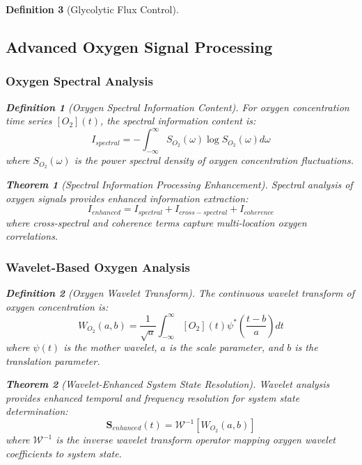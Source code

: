 \documentclass[12pt,a4paper]{article}
\newtheorem{theorem}{Theorem}
\newtheorem{definition}{Definition}
\begin{document}
\begin{definition}[Glycolytic Flux Control]
\subsection{Advanced Oxygen Signal Processing}

\subsubsection{Oxygen Spectral Analysis}

\begin{definition}[Oxygen Spectral Information Content]
For oxygen concentration time series $[O_2](t)$, the spectral information content is:
\begin{equation}
I_{spectral} = -\int_{-\infty}^{\infty} S_{O_2}(\omega) \log S_{O_2}(\omega) d\omega
\end{equation}
where $S_{O_2}(\omega)$ is the power spectral density of oxygen concentration fluctuations.
\end{definition}

\begin{theorem}[Spectral Information Processing Enhancement]
Spectral analysis of oxygen signals provides enhanced information extraction:
\begin{equation}
I_{enhanced} = I_{spectral} + I_{cross-spectral} + I_{coherence}
\end{equation}
where cross-spectral and coherence terms capture multi-location oxygen correlations.
\end{theorem}

\subsubsection{Wavelet-Based Oxygen Analysis}

\begin{definition}[Oxygen Wavelet Transform]
The continuous wavelet transform of oxygen concentration is:
\begin{equation}
W_{O_2}(a, b) = \frac{1}{\sqrt{a}} \int_{-\infty}^{\infty} [O_2](t) \psi^*\left(\frac{t-b}{a}\right) dt
\end{equation}
where $\psi(t)$ is the mother wavelet, $a$ is the scale parameter, and $b$ is the translation parameter.
\end{definition}

\begin{theorem}[Wavelet-Enhanced System State Resolution]
Wavelet analysis provides enhanced temporal and frequency resolution for system state determination:
\begin{equation}
\mathbf{S}_{enhanced}(t) = \mathcal{W}^{-1}[W_{O_2}(a, b)]
\end{equation}
where $\mathcal{W}^{-1}$ is the inverse wavelet transform operator mapping oxygen wavelet coefficients to system state.
\end{theorem}


\end{definition}
\end{document}
